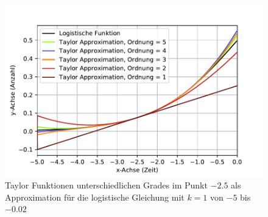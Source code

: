 \begin{figure}
	\begin{center}
		\includegraphics[width=12cm]{papers/taylor/taylorPictures/TaylorFunktion.pdf}
		\caption{Taylor Funktionen unterschiedlichen Grades im Punkt $-2.5$ als Approximation für die logistische Gleichung mit $k=1$ von $-5$ bis $-0.02$}
		\label{taylor:section:fig:TaylorFunktion}
	\end{center}
\end{figure}

